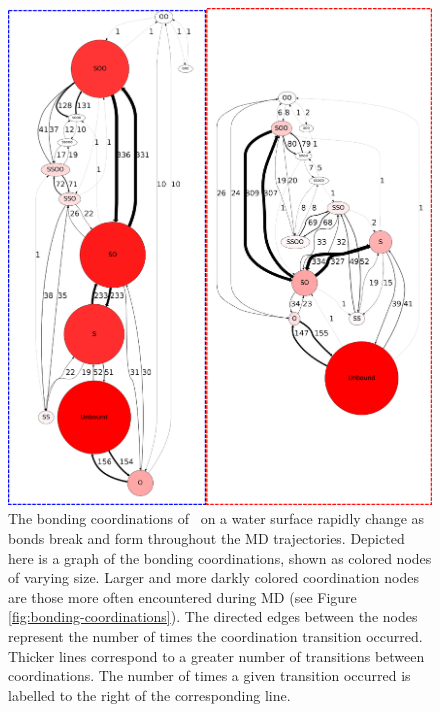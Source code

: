 \documentclass{article}
\begin{document}
\begin{figure}[h!]
	\begin{center}
		\includegraphics[scale=1.0]{coordination-transitions.png}
		\caption{The bonding coordinations of \suldiox~on a water surface rapidly change as bonds break and form throughout the MD trajectories. Depicted here is a graph of the bonding coordinations, shown as colored nodes of varying size. Larger and more darkly colored coordination nodes are those more often encountered during MD (see Figure \ref{fig:bonding-coordinations}). The directed edges between the nodes represent the number of times the coordination transition occurred. Thicker lines correspond to a greater number of transitions between coordinations. The number of times a given transition occurred is labelled to the right of the corresponding line.}
		\label{fig:coordination-transitions}
	\end{center}
\end{figure}
\end{document}
